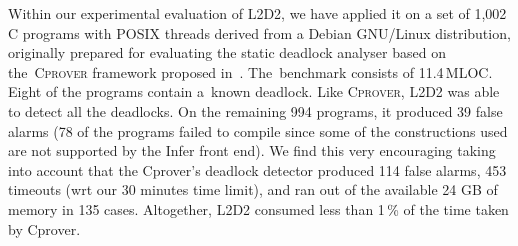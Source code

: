 \documentclass[runningheads]{llncs}
\begin{document}
Within our experimental evaluation of L2D2, we have applied it on a set of 1,002
C programs with POSIX threads derived from a Debian GNU/Linux distribution,
originally prepared for evaluating the static deadlock analyser based on
the~\textsc{Cprover} framework proposed in~\cite{kroening16}.
%
The~benchmark consists of 11.4\,MLOC.
%
Eight of the programs contain a~known deadlock.
%
Like \textsc{Cprover}, \textsc{L2D2} was able to detect all the deadlocks.
%
On the remaining 994 programs, it produced 39 false alarms (78 of the programs
failed to compile since some of the constructions used are not supported by the
Infer front end).
%
We find this very encouraging taking into account that the Cprover's deadlock
detector produced 114 false alarms, 453 timeouts (wrt our 30 minutes time
limit), and ran out of the available 24 GB of memory in 135 cases.
%
Altogether, L2D2 consumed less than 1\,\% of the time taken by Cprover.



\enlargethispage{5mm}

\vspace*{-2mm}


%
%
\end{document}
